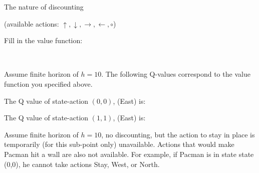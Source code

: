 \begin{problem}[]{The nature of discounting}
\begin{question}[6]
{\begin{minipage}[t]{.5\textwidth}
(available actions: $\uparrow, \downarrow, \rightarrow, \leftarrow, \circ$)
\end{minipage}
\begin{minipage}[t]{.5\textwidth}
\centering

Fill in the value function:

\end{minipage}}\\

\end{question}

\begin{question}
Assume finite horizon of $h = 10$. The following Q-values correspond to the value function you specified above.\\

\begin{subquestion}[2]
The Q value of state-action $(0,0)$, (East) is: \underline{\hspace{1cm}\solution{}{\OneBi}\hspace{1cm}}
\end{subquestion}

\begin{subquestion}[2]
The Q value of state-action $(1,1)$, (East) is: \underline{\hspace{1cm}\solution{}{\OneBii}\hspace{1cm}}
\end{subquestion}

\end{question}


\begin{question}
Assume finite horizon of $h = 10$, no discounting, but the action to stay in place is temporarily (for this sub-point only) unavailable. Actions that would make Pacman hit a wall are also not available. For example, if Pacman is in state state (0,0), he cannot take actions Stay, West, or North.
\\


\end{question}
\end{problem}
